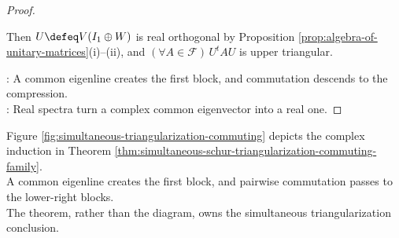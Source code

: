 \begin{theorem}
\begin{proof}
\begin{enumerate}[label=(\roman*)]
Then $U\defeq V(I_1\oplus W)$ is real orthogonal by Proposition \ref{prop:algebra-of-unitary-matrices}(i)--(ii), and $(\forall A\in\mathcal{F})\,U^tAU$ is upper triangular.
\end{enumerate}
: A common eigenline creates the first block, and commutation descends to the compression.\\
: Real spectra turn a complex common eigenvector into a real one.
\end{proof}
\end{theorem}

Figure \ref{fig:simultaneous-triangularization-commuting} depicts the complex induction in Theorem \ref{thm:simultaneous-schur-triangularization-commuting-family}.\\
A common eigenline creates the first block, and pairwise commutation passes to the lower-right blocks.\\
The theorem, rather than the diagram, owns the simultaneous triangularization conclusion.

\begin{illustrationfigure}[H]
  \centering
  
  \caption{A shared eigenline determines a simultaneous first block; lower-right compressions remain commuting.}
  \label{fig:simultaneous-triangularization-commuting}
\end{illustrationfigure}

